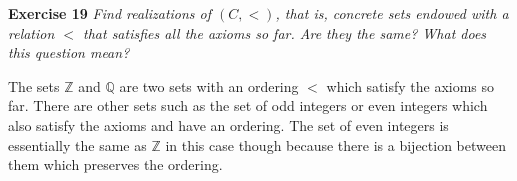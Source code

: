 \documentclass{article}
\begin{document}
\begin{flushleft}
\textbf{Exercise 19}
\textsl{Find realizations of $(C, <)$, that is, concrete sets endowed with a relation $<$ that satisfies all the axioms so far. Are they the same? What does this question mean?}\newline

The sets $\mathbb{Z}$ and $\mathbb{Q}$ are two sets with an ordering $<$ which satisfy the axioms so far. There are other sets such as the set of odd integers or even integers which also satisfy the axioms and have an ordering. The set of even integers is essentially the same as $\mathbb{Z}$ in this case though because there is a bijection between them which preserves the ordering.

\end{flushleft}
\end{document}
